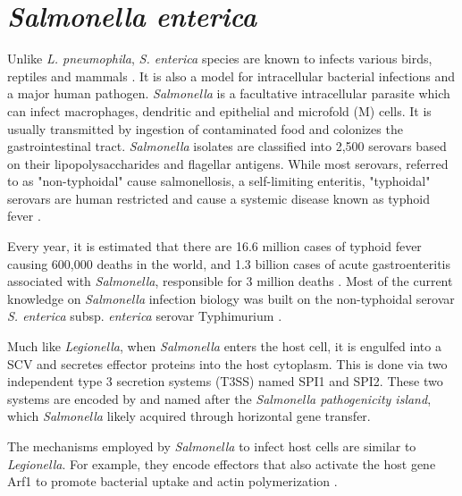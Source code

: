 \section{\textit{Salmonella enterica}}

Unlike \textit{L. pneumophila}, \textit{S. enterica} species are known to infects various birds, reptiles and mammals \cite{uzzauHostAdaptedSerotypes2000}. It is also a model for intracellular bacterial infections and a major human pathogen. \textit{Salmonella} is a facultative intracellular parasite which can infect macrophages, dendritic and epithelial and microfold (M) cells. It is usually transmitted by ingestion of contaminated food and colonizes the gastrointestinal tract. \textit{Salmonella} isolates are classified into 2,500 serovars based on their lipopolysaccharides and flagellar antigens. While most serovars, referred to as "non-typhoidal" cause salmonellosis, a self-limiting enteritis, "typhoidal" serovars are human restricted and cause a systemic disease known as typhoid fever \cite{larockSalmonellaeInteractionsHost2015}.

Every year, it is estimated that there are 16.6 million cases of typhoid fever causing 600,000 deaths in the world, and 1.3 billion cases of acute gastroenteritis associated with \textit{Salmonella}, responsible for 3 million deaths \cite{pangTyphoidFeverOther1995}. Most of the current knowledge on \textit{Salmonella} infection biology was built on the non-typhoidal serovar \textit{S. enterica} subsp. \textit{enterica} serovar Typhimurium \cite{larockSalmonellaeInteractionsHost2015}. 

Much like \textit{Legionella}, when \textit{Salmonella} enters the host cell, it is engulfed into a \acrfull{SCV}  and secretes effector proteins into the host cytoplasm. This is done via two independent type 3 secretion systems (T3SS) named SPI1 and SPI2. These two systems are encoded by and named after the \textit{Salmonella pathogenicity island}, which \textit{Salmonella} likely acquired through horizontal gene transfer.

The mechanisms employed by \textit{Salmonella} to infect host cells are similar to \textit{Legionella}. For example, they encode effectors that also activate the host gene Arf1 to promote bacterial uptake and actin polymerization \cite{larockSalmonellaeInteractionsHost2015}.

